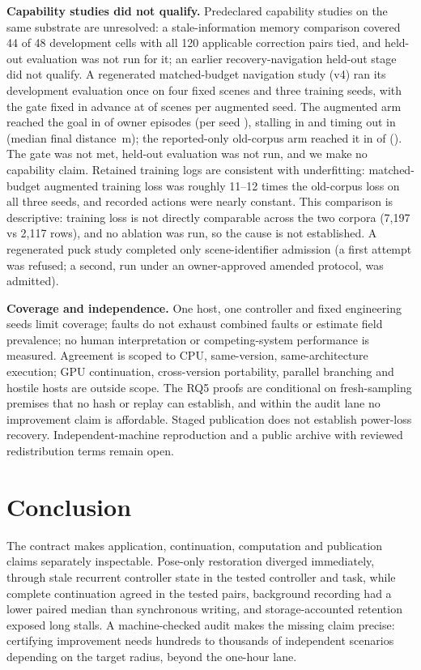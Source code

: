 \documentclass[letterpaper]{article}
\begin{document}
\textbf{Capability studies did not qualify.} Predeclared capability studies on the same substrate are unresolved: a
stale-information memory comparison covered 44 of 48 development cells with all 120 applicable correction pairs tied, and
held-out evaluation was not run for it; an earlier recovery-navigation held-out stage did not qualify. A regenerated
matched-budget navigation study (v4) ran its development evaluation once on four fixed scenes and three training seeds,
with the gate fixed in advance at \MaleVfourThreshold{} of \MaleVfourScenes{} scenes per augmented seed. The augmented arm reached the goal
in \MaleVfourAugGoals{} of \MaleVfourEpisodes{} owner episodes (per seed \MaleVfourAugBySeed{}), stalling in \MaleVfourAugStalled{} and timing
out in \MaleVfourAugTimeLimit{} (median final distance \MaleVfourAugMedianDistance{}\,m); the reported-only old-corpus arm
reached it in \MaleVfourOldGoals{} of \MaleVfourEpisodes{} (\MaleVfourOldBySeed{}). The gate was not met, held-out evaluation was not run, and
we make no capability claim. Retained training logs are consistent with underfitting: matched-budget augmented training
loss was roughly 11--12 times the old-corpus loss on all three seeds, and recorded actions were nearly constant. This
comparison is descriptive: training loss is not directly comparable across the two corpora (7,197 vs 2,117 rows), and no
ablation was run, so the cause is not established. A regenerated puck study completed only scene-identifier admission (a first attempt was refused; a second, run under an owner-approved amended protocol, was admitted).

\textbf{Coverage and independence.} One host, one controller and fixed engineering seeds limit coverage; faults do not
exhaust combined faults or estimate field prevalence; no human interpretation or competing-system performance is measured.
Agreement is scoped to CPU, same-version, same-architecture execution; GPU continuation, cross-version portability, parallel
branching and hostile hosts are outside scope. The RQ5 proofs are conditional on fresh-sampling premises that no hash or
replay can establish, and within the audit lane no improvement claim is affordable. Staged publication does not establish
power-loss recovery. Independent-machine reproduction and a public archive with reviewed redistribution terms remain open.

\section{Conclusion}
The contract makes application, continuation, computation and publication claims separately inspectable. Pose-only
restoration diverged immediately, through stale recurrent controller state in the tested controller and task, while complete continuation agreed in the tested pairs, background recording had a lower
paired median than synchronous writing, and storage-accounted retention exposed long stalls. A machine-checked audit makes
the missing claim precise: certifying improvement needs hundreds to thousands of independent scenarios depending on the target radius, beyond the one-hour lane.
\end{document}
